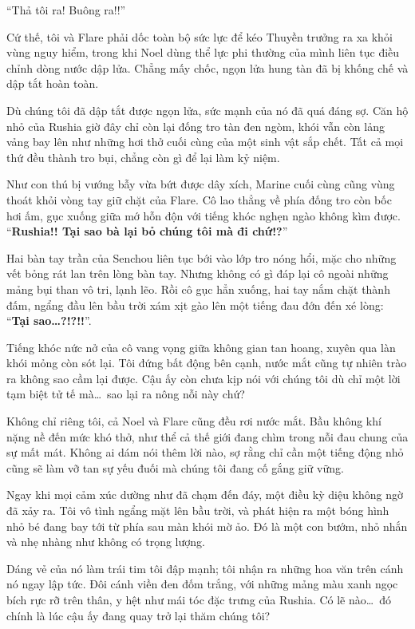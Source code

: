 \documentclass[../main.tex]{subfiles}
\begin{document}
``Thả tôi ra! Buông ra!!''

Cứ thế, tôi và Flare phải dốc toàn bộ sức lực để kéo Thuyền trưởng ra xa khỏi vùng nguy hiểm, trong khi Noel dùng thể lực phi thường của mình liên tục điều chỉnh dòng nước dập lửa. Chẳng mấy chốc, ngọn lửa hung tàn đã bị khống chế và dập tắt hoàn toàn.

Dù chúng tôi đã dập tắt được ngọn lửa, sức mạnh của nó đã quá đáng sợ. Căn hộ nhỏ của Rushia giờ đây chỉ còn lại đống tro tàn đen ngòm, khói vẫn còn lảng vảng bay lên như những hơi thở cuối cùng của một sinh vật sắp chết. Tất cả mọi thứ đều thành tro bụi, chẳng còn gì để lại làm kỷ niệm.

Như con thú bị vướng bẫy vừa bứt được dây xích, Marine cuối cùng cũng vùng thoát khỏi vòng tay giữ chặt của Flare. Cô lao thẳng về phía đống tro còn bốc hơi ấm, gục xuống giữa mớ hỗn độn với tiếng khóc nghẹn ngào không kìm được. ``\textbf{Rushia!! Tại sao bà lại bỏ chúng tôi mà đi chứ!?}''

Hai bàn tay trần của Senchou liên tục bới vào lớp tro nóng hổi, mặc cho những vết bỏng rát lan trên lòng bàn tay. Nhưng không có gì đáp lại cô ngoài những mảng bụi than vô tri, lạnh lẽo. Rồi cô gục hẳn xuống, hai tay nắm chặt thành đấm, ngẩng đầu lên bầu trời xám xịt gào lên một tiếng đau đớn đến xé lòng: ``{\Large \textbf{Tại sao\dots?!?!!}}''.

Tiếng khóc nức nở của cô vang vọng giữa không gian tan hoang, xuyên qua làn khói mỏng còn sót lại. Tôi đứng bất động bên cạnh, nước mắt cũng tự nhiên trào ra không sao cầm lại được. Cậu ấy còn chưa kịp nói với chúng tôi dù chỉ một lời tạm biệt tử tế mà\dots\ sao lại ra nông nỗi này chứ?

Không chỉ riêng tôi, cả Noel và Flare cũng đều rơi nước mắt. Bầu không khí nặng nề đến mức khó thở, như thể cả thế giới đang chìm trong nỗi đau chung của sự mất mát. Không ai dám nói thêm lời nào, sợ rằng chỉ cần một tiếng động nhỏ cũng sẽ làm vỡ tan sự yếu đuối mà chúng tôi đang cố gắng giữ vững.

Ngay khi mọi cảm xúc dường như đã chạm đến đáy, một điều kỳ diệu không ngờ đã xảy ra. Tôi vô tình ngẩng mặt lên bầu trời, và phát hiện ra một bóng hình nhỏ bé đang bay tới từ phía sau màn khói mờ ảo. Đó là một con bướm, nhỏ nhắn và nhẹ nhàng như không có trọng lượng.

Dáng vẻ của nó làm trái tim tôi đập mạnh; tôi nhận ra những hoa văn trên cánh nó ngay lập tức. Đôi cánh viền đen đốm trắng, với những mảng màu xanh ngọc bích rực rỡ trên thân, y hệt như mái tóc đặc trưng của Rushia. Có lẽ nào\dots\ đó chính là lúc cậu ấy đang quay trở lại thăm chúng tôi?
\end{document}
